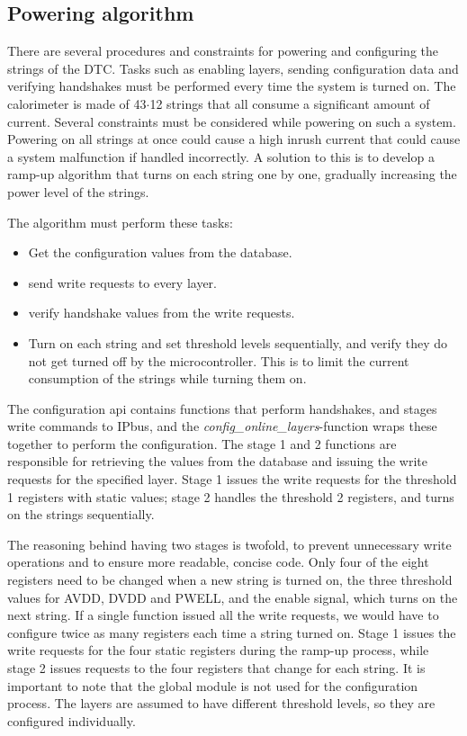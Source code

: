 \documentclass[main.tex]{subfiles}
\begin{document}
\subsection{Powering algorithm}
\label{ssec: power_algo}
There are several procedures and constraints for powering and configuring the strings of the DTC. Tasks such as enabling layers, sending configuration data and verifying handshakes must be performed every time the system is turned on. The calorimeter is made of 43$\cdot$12 strings that all consume a significant amount of current. Several constraints must be considered while powering on such a system. Powering on all strings at once could cause a high inrush current that could cause a system malfunction if handled incorrectly. A solution to this is to develop a ramp-up algorithm that turns on each string one by one, gradually increasing the power level of the strings. 

The algorithm must perform these tasks:

\begin{itemize}
    \item Get the configuration values from the database.
    \item send write requests to every layer.
    \item verify handshake values from the write requests.
    \item Turn on each string and set threshold levels sequentially, and verify they do not get turned off by the microcontroller. This is to limit the current consumption of the strings while turning them on.
\end{itemize}

The configuration \gls{api} contains functions that perform handshakes, and stages write commands to IPbus, and the \textit{config\_online\_layers}-function wraps these together to perform the configuration. The stage 1 and 2 functions are responsible for retrieving the values from the database and issuing the write requests for the specified layer. Stage 1 issues the write requests for the threshold 1 registers with static values; stage 2 handles the threshold 2 registers, and turns on the strings sequentially.

The reasoning behind having two stages is twofold, to prevent unnecessary write operations and to ensure more readable, concise code. Only four of the eight registers need to be changed when a new string is turned on, the three threshold values for AVDD, DVDD and PWELL, and the enable signal, which turns on the next string. If a single function issued all the write requests, we would have to configure twice as many registers each time a string turned on. Stage 1 issues the write requests for the four static registers during the ramp-up process, while stage 2 issues requests to the four registers that change for each string. It is important to note that the global module is not used for the configuration process. The layers are assumed to have different threshold levels, so they are configured individually.
\end{document}
